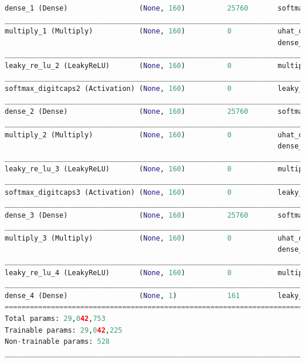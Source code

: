 \begin{lstlisting}[basicstyle=\scriptsize,language=Python]
dense_1 (Dense)                 (None, 160)          25760       softmax_digitcaps1[0][0]   
____________________________________________________________________________________________
multiply_1 (Multiply)           (None, 160)          0           uhat_digitcaps[0][0]       
                                                                 dense_1[0][0]              
____________________________________________________________________________________________
leaky_re_lu_2 (LeakyReLU)       (None, 160)          0           multiply_1[0][0]           
____________________________________________________________________________________________
softmax_digitcaps2 (Activation) (None, 160)          0           leaky_re_lu_2[0][0]        
____________________________________________________________________________________________
dense_2 (Dense)                 (None, 160)          25760       softmax_digitcaps2[0][0]   
____________________________________________________________________________________________
multiply_2 (Multiply)           (None, 160)          0           uhat_digitcaps[0][0]       
                                                                 dense_2[0][0]              
____________________________________________________________________________________________
leaky_re_lu_3 (LeakyReLU)       (None, 160)          0           multiply_2[0][0]           
____________________________________________________________________________________________
softmax_digitcaps3 (Activation) (None, 160)          0           leaky_re_lu_3[0][0]        
____________________________________________________________________________________________
dense_3 (Dense)                 (None, 160)          25760       softmax_digitcaps3[0][0]   
____________________________________________________________________________________________
multiply_3 (Multiply)           (None, 160)          0           uhat_digitcaps[0][0]       
                                                                 dense_3[0][0]              
____________________________________________________________________________________________
leaky_re_lu_4 (LeakyReLU)       (None, 160)          0           multiply_3[0][0]           
____________________________________________________________________________________________
dense_4 (Dense)                 (None, 1)            161         leaky_re_lu_4[0][0]        
============================================================================================
Total params: 29,042,753
Trainable params: 29,042,225
Non-trainable params: 528
____________________________________________________________________________________________
\end{lstlisting}

